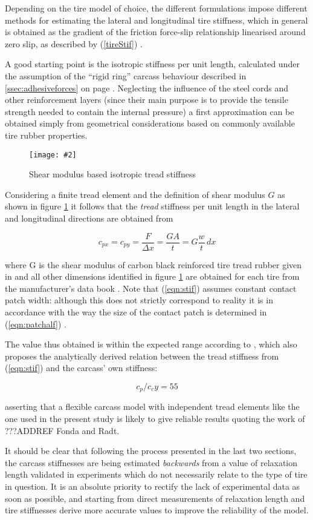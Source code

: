 \documentclass[12pt,a4paper]{report}
\newcommand{\virgolette}[1]{
\textquotedblleft #1\textquotedblright
}
\newcommand{\figura}[5][htbp]{
\begin{figure}[#1]
\begin{center}
\texttt{[image: \#2]}
\caption{#4}\label{#5}
\end{center}
\end{figure}
}
\newcommand{\eq}[2]{
\begin{equation} \label{#1}
#2
\end{equation}
}
\newcommand{\req}[1]{
(\ref{#1})
}
\begin{document}
Depending on the tire model of choice, the different formulations impose different methods for estimating the lateral and longitudinal tire stiffness, which in general is obtained as the gradient of the friction force-slip relationship linearised around zero slip, as described by \req{tireStif}.

A good starting point is the isotropic stiffness per unit length, calculated under the assumption of the \virgolette{rigid ring} carcass behaviour described in \ref{ssec:adhesiveforces} on page \pageref{stifcarcass}.
Neglecting the influence of the steel cords and other reinforcement layers (since their main purpose is to provide the tensile strength needed to contain the internal pressure) a first approximation can be obtained simply from geometrical considerations based on commonly available tire rubber properties.

\figura{piczero.jpg}{}{Shear modulus based isotropic tread stiffness}{fig:shear}

Considering a finite tread element and the definition of shear modulus $G$ as shown in figure \ref{fig:shear} it follows that the \emph{tread} stiffness per unit length in the lateral and longitudinal directions are obtained from
\eq{eqn:stif}{c_{px} = c_{py} = \frac{F}{\Delta x} = \frac{GA}{t} = G \frac{w}{t} \, dx}
where G is the shear modulus of carbon black reinforced tire tread rubber given in \citep{nhtsa} and all other dimensions identified in figure \ref{fig:shear} are obtained for each tire from the manufacturer's data book \citep{GYtirespecs}. Note that \req{eqn:stif} assumes constant contact patch width: although this does not strictly correspond to reality it is in accordance with the way the size of the contact patch is determined in \req{eqn:patchalf}.

The value thus obtained is within the expected range according to \citep{nhtsa}, which also proposes the analytically derived relation between the tread stiffness from \req{eqn:stif} and the carcass' own stiffness:
\eq{eqn:stifratio}{c_p/c_cy = 55}
asserting that a flexible carcass model with independent tread elements like the one used in the present study is likely to give reliable results quoting the work of ???ADDREF Fonda and Radt.

It should be clear that following the process presented in the last two sections, the carcass stiffnesses are being estimated \emph{backwards} from a value of relaxation length validated in experiments which do not necessarily relate to the type of tire in question.
It is an absolute priority to rectify the lack of experimental data as soon as possible, and starting from direct measurements of relaxation length and tire stiffnesses derive more accurate values to improve the reliability of the model.
\end{document}

